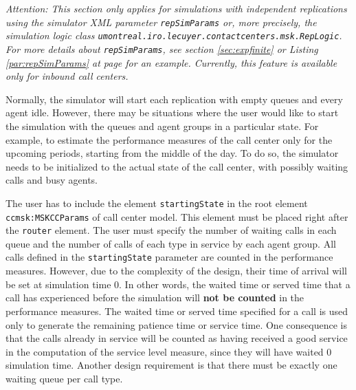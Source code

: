 \textit{Attention: This section only applies for simulations
with independent replications 
using the simulator XML parameter {\tt repSimParams}
or, more precisely, the simulation logic class 
{\tt umontreal.iro.lecuyer.contactcenters.msk.RepLogic}.
For more details about {\tt repSimParams}, see
section \ref{sec:expfinite} or Listing \ref{par:repSimParams} at page
\pageref{par:repSimParams} for an example.
Currently, this feature is available only for inbound call centers.
}

Normally, the simulator will start each replication with empty queues
and every agent idle.
However, there may be situations where the user would like to start
the simulation with the queues and agent groups in a particular state.
For example, to estimate the performance measures of the call center
only for the upcoming periods, starting from the middle of the day.
To do so, the simulator needs to be initialized to the actual state
of the call center, with possibly waiting calls and busy agents.

The user has to include the element \texttt{startingState}
in the root element \texttt{ccmsk:MSKCC\-Params} of call center model.
This element must be placed right after the \texttt{router} element.
The user must specify the number of waiting calls in each queue and 
the number of calls of each type in service by each agent group.
All calls defined in the \texttt{startingState} parameter are counted
in the performance measures.
However, due to the complexity of the design, 
their time of arrival will be set at simulation time 0.
In other words, the waited time or served time that a call has experienced
before the simulation will \textbf{not be counted} in the performance measures.
The waited time or served time specified for a call is
used only to generate the remaining patience time or service time.
One consequence is that the calls already in service 
will be counted as having received a good service
in the computation of the service level measure, since they will
have waited 0 simulation time.
Another design requirement
is that there must be exactly one waiting queue per call type.


